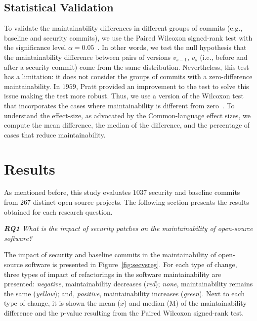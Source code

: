 \documentclass[sigconf,review]{acmart}
\begin{document}
\subsection{Statistical Validation}\label{sec:statsval}
%
To validate the maintainability differences in different groups of commits
(e.g., baseline and security commits), we use the Paired Wilcoxon signed-rank
test with the significance level $\alpha = 0.05$~\cite{10.2307/3001968}. In
other words, we test the null hypothesis that the maintainability difference
between pairs of versions $v_{s-1}$, $v_s$ (i.e., before and after a
security-commit) come from the same distribution. Nevertheless, this test has a
limitation: it does not consider the groups of commits with a zero-difference
maintainability. In $1959$, Pratt provided an improvement to the test to solve
this issue making the test more robust. Thus, we use a version of the Wilcoxon
test that incorporates the cases where maintainability is different from zero~\cite{10.2307/2282543}.
To understand the effect-size, as
advocated by the Common-language effect sizes\cite{graw:1992}, we compute the
mean difference, the median of the difference, and the percentage of cases that
reduce maintainability.
%
\section{Results}\label{sec:results}

As mentioned before, this study evaluates $1037$ security and baseline commits
from $267$ distinct open-source projects. The following section presents the
results obtained for each research question.

\begin{framed}
\textit{\textbf{RQ1} What is the impact of security patches on the
maintainability of open-source software?}
\vspace{-0.1cm}
\end{framed}
\vspace{-0.1cm}

The impact of security and baseline commits in the maintainability of
open-source software is presented in Figure~\ref{fig:secvsreg}. For each type of
change, three types of impact of refactorings in the software maintainability
are presented: \emph{negative}, maintainability decreases (\emph{red});
\emph{none}, maintainability remains the same (\emph{yellow}); and,
\emph{positive}, maintainability increases (\emph{green}). Next to each
type of change, it is shown the mean ($\overline{x}$) and median (M)
of the maintainability difference and the p-value resulting from the
Paired Wilcoxon signed-rank test.
\end{document}
